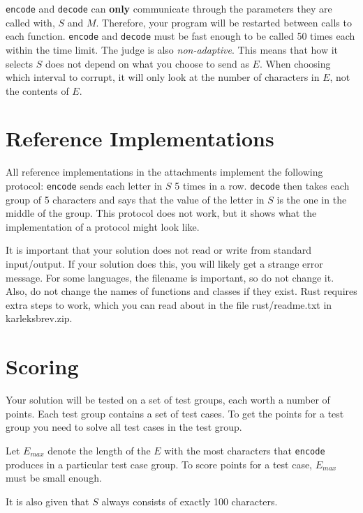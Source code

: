 \texttt{encode} and \texttt{decode} can \textbf{only} communicate through the parameters they are called with, 
$S$ and $M$. Therefore, your program will be restarted between calls to each function. 
\texttt{encode} and \texttt{decode} must be fast enough to be called 50 times each within the time limit. 
The judge is also \textit{non-adaptive}. This means that how it selects $S$ 
does not depend on what you choose to send as $E$. When choosing which interval to corrupt, it will only
look at the number of characters in $E$, not the contents of $E$.

\section*{Reference Implementations}
All reference implementations in the attachments implement the following protocol: \texttt{encode} sends each 
letter in $S$ 5 times in a row. \texttt{decode} then takes each group of 5 characters and says that the value 
of the letter in $S$ is the one in the middle of the group. This protocol does not work, but it shows what
the implementation of a protocol might look like.

It is important that your solution does not read or write from standard input/output. If your solution does this, 
you will likely get a strange error message. For some languages, the filename is important, so do not change it. Also, 
do not change the names of functions and classes if they exist. Rust requires extra steps to work, which you can
read about in the file rust/readme.txt in karleksbrev.zip.

\section*{Scoring}
Your solution will be tested on a set of test groups, each worth a number of points. Each test group contains
a set of test cases. To get the points for a test group you need to solve all test cases in the test group.

Let $E_{max}$ denote the length of the $E$ with the most characters that \texttt{encode} produces in a 
particular test case group. To score points for a test case, $E_{max}$ must be small enough.

It is also given that $S$ always consists of exactly 100 characters.

